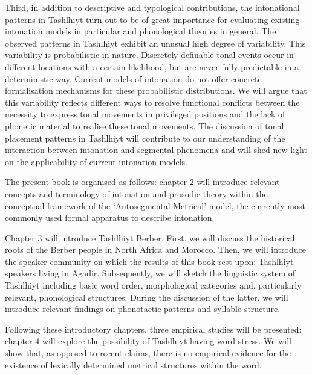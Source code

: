 Third, in addition to descriptive and typological contributions, the intonational patterns in Tashlhiyt turn out to be of great importance for evaluating existing intonation models in particular and phonological theories in general. The observed patterns in Tashlhiyt exhibit an unusual high degree of variability. This variability is probabilistic in nature. Discretely definable tonal events occur in different locations with a certain likelihood, but are never fully predictable in a deterministic way. Current models of intonation do not offer concrete formalisation mechanisms for these probabilistic distributions. We will argue that this variability reflects different ways to resolve functional conflicts between the necessity to express tonal movements in privileged positions and the lack of phonetic material to realise these tonal movements. The discussion of tonal placement patterns in Tashlhiyt will contribute to our understanding of the interaction between intonation and segmental phenomena and will shed new light on the applicability of current intonation models. 

The present book is organised as follows: chapter 2 will introduce relevant concepts and terminology of intonation and prosodic theory within the conceptual framework of the ‘Autosegmental-Metrical’ model, the currently most commonly used formal apparatus to describe intonation.

Chapter 3 will introduce Tashlhiyt Berber. First, we will discuss the historical roots of the Berber people in North Africa and Morocco. Then, we will introduce the speaker community on which the results of this book rest upon: Tashlhiyt speakers living in Agadir. Subsequently, we will sketch the linguistic system of Tashlhiyt including basic word order, morphological categories and, particularly relevant, phonological structures. During the discussion of the latter, we will introduce relevant findings on phonotactic patterns and syllable structure.

Following these introductory chapters, three empirical studies will be presented: chapter 4 will explore the possibility of Tashlhiyt having word stress. We will show that, as opposed to recent claims, there is no empirical evidence for the existence of lexically determined metrical structures within the word. 

